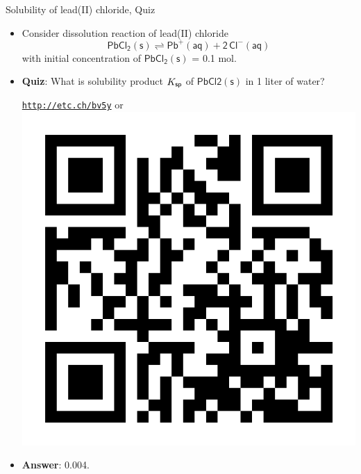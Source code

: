 %
\begin{frame}{Solubility of lead(II) chloride, Quiz}
	\begin{itemize}
		\item Consider dissolution reaction of lead(II) chloride 
		\[
		\mathsf{PbCl_2(s) \rightleftharpoons Pb^{+}(aq) + 2\, Cl^{-}(aq)}
		\]
		with initial concentration of $\mathsf{PbCl_2(s)}$ = 0.1 mol.
		\item  \alert{\bf Quiz}: What is solubility product $K_{\sf sp}$ of $\mathsf{PbCl2(s)}$ in 1 liter of water?
		\begin{center}
			\href{http://etc.ch/bv5y}{\textcolor{indigo(dye)}{\tt http://etc.ch/bv5y}} 
			\quad
			or 
			\quad
			\includegraphics[height=0.3\columnwidth]{figures/chemical-equilibrium/poll.png}
		\end{center}
		\hiddenpause
		\item {\bf Answer}:  0.004.
	\end{itemize}
\end{frame}	

